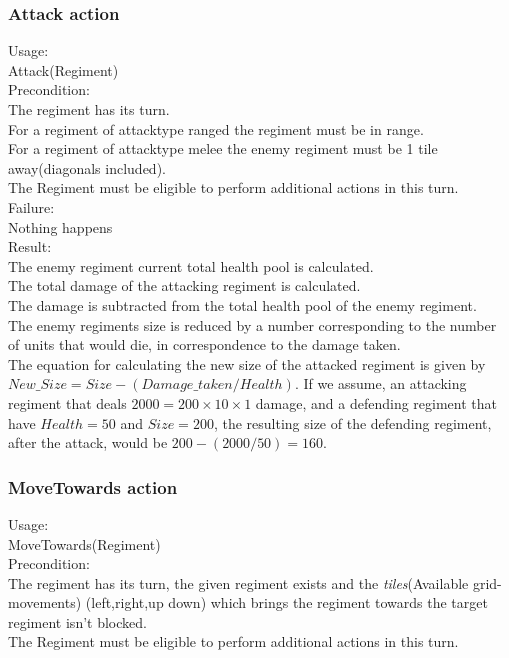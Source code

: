 		\subsubsection{Attack action}
		Usage: \\
		Attack(Regiment) \\
		
		Precondition: \\
		The regiment has its turn. \\
		For a regiment of attacktype ranged the regiment must be in range. \\
		For a regiment of attacktype melee the enemy regiment must be 1 tile away(diagonals included). \\
		The Regiment must be eligible to perform additional actions in this turn.\\
		
		Failure: \\
		Nothing happens \\
		
		Result: \\
		The enemy regiment current total health pool is calculated.\\ 
		The total damage of the attacking regiment is calculated. \\
		The damage is subtracted from the total health pool of the enemy regiment.\\
		The enemy regiments size is reduced by a number corresponding to the number of units that would die, in correspondence to the damage taken.\\
		The equation for calculating the new size of the attacked regiment is given by \\
		$New\_Size = Size - (Damage\_taken / Health)$.
		If we assume, an attacking regiment that deals $2000 = 200 \times 10 \times 1$ damage, and a defending regiment that have $Health = 50$ and $Size = 200$, the resulting size of the defending regiment, after the attack, would be $200-(2000/50)=160$.
		
		\subsubsection{MoveTowards action}
		Usage: \\
		MoveTowards(Regiment) \\
		
		Precondition: \\
		The regiment has its turn, the given regiment exists and the \textit{tiles}(Available grid-movements) (left,right,up down) 
		which brings the regiment towards the target regiment isn't blocked.\\
		The Regiment must be eligible to perform additional actions in this turn.\\
		
